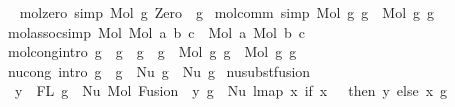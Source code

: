 \begin{isabellebody}
\isanewline
\ \isanewline
{\isacharbar}{\kern0pt}\ mol{\isacharunderscore}{\kern0pt}zero\ {\isacharbrackleft}{\kern0pt}simp{\isacharbrackright}{\kern0pt}{\isacharcolon}{\kern0pt}\ {\isachardoublequoteopen}Mol\ g\ Zero\ {\isasymsimeq}\ g{\isachardoublequoteclose}\isanewline
{\isacharbar}{\kern0pt}\ mol{\isacharunderscore}{\kern0pt}comm\ {\isacharbrackleft}{\kern0pt}simp{\isacharbrackright}{\kern0pt}{\isacharcolon}{\kern0pt}\ {\isachardoublequoteopen}Mol\ g{}\ g{}\ {\isasymsimeq}\ Mol\ g{}\ g{}{\isachardoublequoteclose}\isanewline
{\isacharbar}{\kern0pt}\ mol{\isacharunderscore}{\kern0pt}assoc{\isacharbrackleft}{\kern0pt}simp{\isacharbrackright}{\kern0pt}{\isacharcolon}{\kern0pt}\ {\isachardoublequoteopen}Mol\ {\isacharparenleft}{\kern0pt}Mol\ a\ b{\isacharparenright}{\kern0pt}\ c\ {\isasymsimeq}\ Mol\ a\ {\isacharparenleft}{\kern0pt}Mol\ b\ c{\isacharparenright}{\kern0pt}{\isachardoublequoteclose}\isanewline
\isanewline
\ \isanewline
{\isacharbar}{\kern0pt}\ mol{\isacharunderscore}{\kern0pt}cong{\isacharbrackleft}{\kern0pt}intro{\isacharbrackright}{\kern0pt}{\isacharcolon}{\kern0pt}\ {\isachardoublequoteopen}g{}\ {\isasymsimeq}\ g{}{\isacharprime}{\kern0pt}\ {\isacharequal}{\kern0pt}{\isacharequal}{\kern0pt}{\isachargreater}{\kern0pt}\ g{}\ {\isasymsimeq}\ g{}{\isacharprime}{\kern0pt}\ {\isacharequal}{\kern0pt}{\isacharequal}{\kern0pt}{\isachargreater}{\kern0pt}\ Mol\ g{}\ g{}\ {\isasymsimeq}\ Mol\ g{}{\isacharprime}{\kern0pt}\ g{}{\isacharprime}{\kern0pt}{\isachardoublequoteclose}\isanewline
{\isacharbar}{\kern0pt}\ nu{\isacharunderscore}{\kern0pt}cong\ {\isacharbrackleft}{\kern0pt}intro{\isacharbrackright}{\kern0pt}{\isacharcolon}{\kern0pt}\ {\isachardoublequoteopen}g\ {\isasymsimeq}\ g{\isacharprime}{\kern0pt}\ {\isacharequal}{\kern0pt}{\isacharequal}{\kern0pt}{\isachargreater}{\kern0pt}\ Nu\ g\ {\isasymsimeq}\ Nu\ g{\isacharprime}{\kern0pt}{\isachardoublequoteclose}\isanewline
\isanewline
\isanewline
\isanewline
{\isacharbar}{\kern0pt}\ nu{\isacharunderscore}{\kern0pt}subst{\isacharunderscore}{\kern0pt}fusion{}{\isacharcolon}{\kern0pt}\isanewline
\ \ {\isachardoublequoteopen}y\ {\isasymin}\ FL\ g\ {\isacharequal}{\kern0pt}{\isacharequal}{\kern0pt}{\isachargreater}{\kern0pt}\ Nu\ {\isacharparenleft}{\kern0pt}Mol\ {\isacharparenleft}{\kern0pt}Fusion\ {}\ y{\isacharparenright}{\kern0pt}\ g{\isacharparenright}{\kern0pt}\ {\isasymsimeq}\ Nu\ {\isacharparenleft}{\kern0pt}lmap\ {\isacharparenleft}{\kern0pt}{\isasymlambda}x{\isachardot}{\kern0pt}\ if\ x\ {\isacharequal}{\kern0pt}\ {}\ then\ y\ else\ x{\isacharparenright}{\kern0pt}\ g{\isacharparenright}{\kern0pt}{\isachardoublequoteclose}\isanewline

\end{isabellebody}
